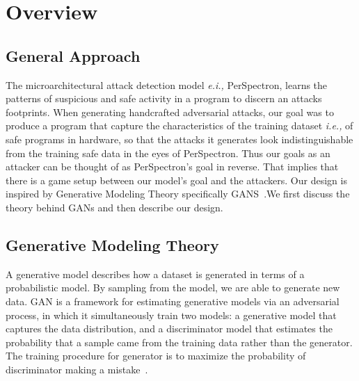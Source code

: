 \section{ Overview}\label{overview}
\subsection{General Approach}

 The microarchitectural attack detection model {\em e.i.,} PerSpectron, learns the patterns of suspicious and safe activity in a program to discern an attacks footprints.
When generating handcrafted adversarial attacks, our goal was to produce a program that capture the characteristics of the training dataset {\em i.e., } of safe programs in hardware, so that the attacks it generates look indistinguishable from the training safe data in the eyes of PerSpectron. Thus our goals as an attacker can be thought of as PerSpectron's goal in reverse. That implies that there is a game setup between our model's goal and the attackers. Our design is inspired by Generative Modeling Theory specifically GANS~\cite{goodfellow2014generative}.We first discuss the theory behind GANs and then describe our design.  


\subsection{Generative Modeling Theory}
A generative model describes how a dataset is generated in
terms of a probabilistic model. By sampling from the model,
we are able to generate new data. GAN is a framework for
estimating generative models via an adversarial process, in
which it simultaneously train two models: a generative model
that captures the data distribution, and a discriminator model
that estimates the probability that a sample came from the
training data rather than the generator. The training procedure
for generator is to maximize the probability of discriminator
making a mistake~\cite{goodfellow2014generative}.



